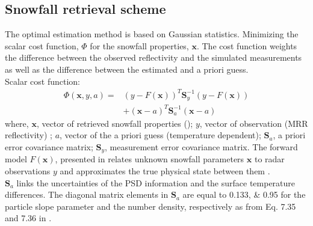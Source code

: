 \subsection{Snowfall retrieval scheme}\label{sec:ret_scheme}
The optimal estimation method is based on Gaussian statistics. Minimizing the scalar cost function, $\Phi$ for the snowfall properties, $\mathbf{x}$. The cost function weights the difference between the observed reflectivity and the simulated measurements as well as the difference between the estimated and a priori guess. %
\\
Scalar cost function:
\begin{equation}
\begin{split}
\Phi(\mathbf{x},y,a) = & (y- F(\mathbf{x}))^T \mathbf{S}_y^{-1} 			(y-F(\mathbf{x})) \\
&+(\mathbf{x}-a)^T \mathbf{S}_{a}^{-1} (\mathbf{x}-a)
\end{split} \label{eq:scalar_cost_fct}
\end{equation}
where, $\mathbf{x}$, vector of retrieved snowfall properties (); $y$, vector of observation (MRR reflectivity) ; $a$, vector of the a priori guess (temperature dependent); $\mathbf{S}_a$, a priori error covariance matrix; $\mathbf{S}_y$, measurement error covariance matrix. The forward model $F(\mathbf{x})$, presented in  relates unknown snowfall parameters $\mathbf{x}$ to radar observations $y$ and approximates the true physical state between them \citep{wood_estimating_2014,cooper_variational_2017}.
%
\\
$\mathbf{S}_a$ links the uncertainties of the PSD information and the surface temperature differences. The diagonal matrix elements in $\mathbf{S}_a$ are equal to \numlist{0.133;0.95} for the particle slope parameter and the number density, respectively as from  Eq. 7.35 and 7.36 in \cite{wood_estimation_2011}. \\
